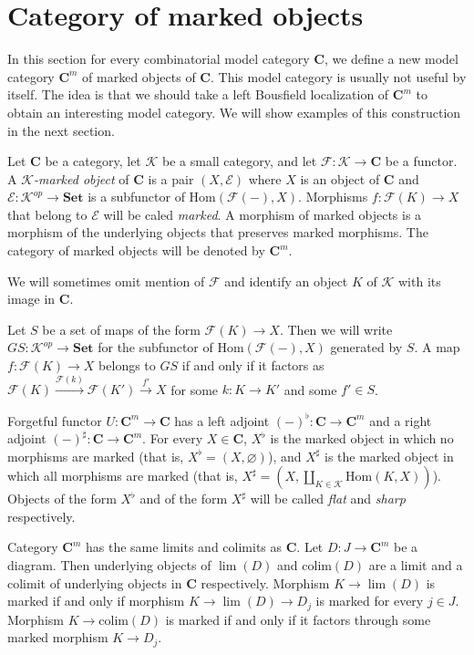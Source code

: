 \documentclass[reqno]{amsart}
\theoremstyle{definition}
\theoremstyle{remark}
\newcommand{\cat}[1]{\mathbf{#1}}
\newcommand{\C}{\cat{C}}
\newcommand{\Set}{\cat{Set}}
\newcommand{\K}{$\mathcal{K}$}
\newcommand{\Hom}{\mathrm{Hom}}
\newcommand{\colim}{\mathrm{colim}}
\numberwithin{figure}{section}
\begin{document}
\section{Category of marked objects}
\label{sec:marked}

In this section for every combinatorial model category $\C$, we define a new model category $\C^m$ of marked objects of $\C$.
This model category is usually not useful by itself.
The idea is that we should take a left Bousfield localization of $\C^m$ to obtain an interesting model category.
We will show examples of this construction in the next section.

\begin{defn}
Let $\C$ be a category, let $\mathcal{K}$ be a small category, and let $\mathcal{F} : \mathcal{K} \to \C$ be a functor.
A \emph{\K-marked object} of $\C$ is a pair $(X,\mathcal{E})$ where $X$ is an object of $\C$ and $\mathcal{E} : \mathcal{K}^{op} \to \Set$ is a subfunctor of $\Hom(\mathcal{F}(-),X)$.
Morphisms $f : \mathcal{F}(K) \to X$ that belong to $\mathcal{E}$ will be caled \emph{marked}.
A morphism of marked objects is a morphism of the underlying objects that preserves marked morphisms.
The category of marked objects will be denoted by $\C^m$.
\end{defn}

We will sometimes omit mention of $\mathcal{F}$ and identify an object $K$ of $\mathcal{K}$ with its image in $\C$.

Let $S$ be a set of maps of the form $\mathcal{F}(K) \to X$.
Then we will write $GS : \mathcal{K}^{op} \to \Set$ for the subfunctor of $\Hom(\mathcal{F}(-),X)$ generated by $S$.
A map $f : \mathcal{F}(K) \to X$ belongs to $GS$ if and only if it factors as $\mathcal{F}(K) \xrightarrow{\mathcal{F}(k)} \mathcal{F}(K') \xrightarrow{f'} X$
for some $k : K \to K'$ and some $f' \in S$.

Forgetful functor $U : \C^m \to \C$ has a left adjoint $(-)^\flat : \C \to \C^m$ and a right adjoint $(-)^\sharp : \C \to \C^m$.
For every $X \in \C$, $X^\flat$ is the marked object in which no morphisms are marked (that is, $X^\flat = (X,\varnothing)$),
and $X^\sharp$ is the marked object in which all morphisms are marked (that is, $X^\sharp = (X,\coprod_{K \in \mathcal{K}} \Hom(K,X))$).
Objects of the form $X^\flat$ and of the form $X^\sharp$ will be called \emph{flat} and \emph{sharp} respectively.

Category $\C^m$ has the same limits and colimits as $\C$.
Let $D : J \to \C^m$ be a diagram.
Then underlying objects of $\lim(D)$ and $\colim(D)$ are a limit and a colimit of underlying objects in $\C$ respectively.
Morphism $K \to \lim(D)$ is marked if and only if morphism $K \to \lim(D) \to D_j$ is marked for every $j \in J$.
Morphism $K \to \colim(D)$ is marked if and only if it factors through some marked morphism $K \to D_j$.
\end{document}
